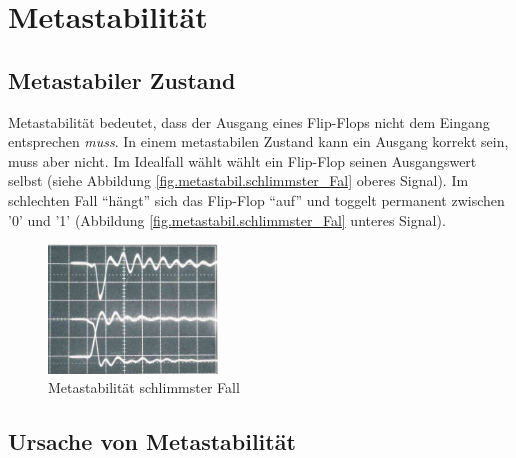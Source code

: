 
\chapter{Metastabilität}\label{chap.metastabilitat}

\section{Metastabiler Zustand}\label{sect.meatastabil_def}
Metastabilität bedeutet, dass der Ausgang eines Flip-Flops nicht dem Eingang entsprechen \textit{muss}. In einem metastabilen Zustand kann ein Ausgang korrekt sein, muss aber nicht.
Im Idealfall wählt wählt ein Flip-Flop seinen Ausgangswert selbst (siehe Abbildung \ref{fig.metastabil.schlimmster_Fal} oberes Signal). Im schlechten Fall “hängt” sich das Flip-Flop “auf” und toggelt permanent zwischen '0' und '1' (Abbildung \ref{fig.metastabil.schlimmster_Fal} unteres Signal).

\begin{figure}[H]
	\centering
	\includegraphics[width=0.4\textwidth]{images/metastability/metastability_2_IO.png}
	\caption{Metastabilität schlimmster Fall \cite{F_metastability}}
	\label{fig.metastabil.schlimmster_Fall}
\end{figure}


\section{Ursache von Metastabilität}\label{sect.meatastabil_ursache}

